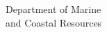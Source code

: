 \documentclass[preview]{standalone}
\begin{document}
\begin{center}
Department of Marine\\and Coastal Resources
\end{center}
\end{document}
